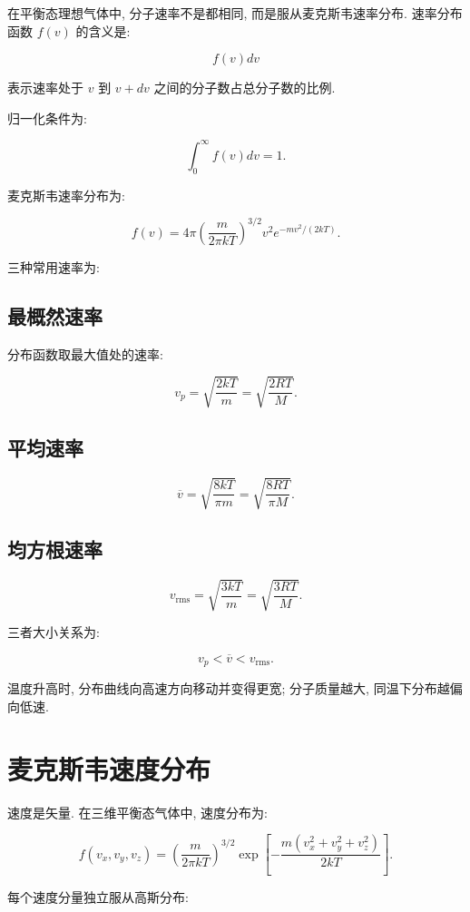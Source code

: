 \documentclass[
  a4paper,
]{ctexrep}
\begin{document}
在平衡态理想气体中, 分子速率不是都相同, 而是服从麦克斯韦速率分布.
速率分布函数 \(f(v)\) 的含义是:

\[
f(v)dv
\]

表示速率处于 \(v\) 到 \(v+dv\) 之间的分子数占总分子数的比例.

归一化条件为:

\[
\int_0^{\infty} f(v)dv=1.
\]

麦克斯韦速率分布为:

\[
f(v)=4\pi\left(\frac{m}{2\pi kT}\right)^{3/2}v^2e^{-mv^2/(2kT)}.
\]

三种常用速率为:

\subsection{最概然速率}\label{ux6700ux6982ux7136ux901fux7387}

分布函数取最大值处的速率:

\[
v_p=\sqrt{\frac{2kT}{m}}=\sqrt{\frac{2RT}{M}}.
\]

\subsection{平均速率}\label{ux5e73ux5747ux901fux7387}

\[
\overline{v}=\sqrt{\frac{8kT}{\pi m}}=\sqrt{\frac{8RT}{\pi M}}.
\]

\subsection{均方根速率}\label{ux5747ux65b9ux6839ux901fux7387}

\[
v_{\mathrm{rms}}=\sqrt{\frac{3kT}{m}}=\sqrt{\frac{3RT}{M}}.
\]

三者大小关系为:

\[
v_p<\overline{v}<v_{\mathrm{rms}}.
\]

温度升高时, 分布曲线向高速方向移动并变得更宽; 分子质量越大,
同温下分布越偏向低速.

\section{麦克斯韦速度分布}\label{ux9ea6ux514bux65afux97e6ux901fux5ea6ux5206ux5e03}

速度是矢量. 在三维平衡态气体中, 速度分布为:

\[
f(v_x,v_y,v_z)=\left(\frac{m}{2\pi kT}\right)^{3/2}
\exp\left[-\frac{m(v_x^2+v_y^2+v_z^2)}{2kT}\right].
\]

每个速度分量独立服从高斯分布:
\end{document}
